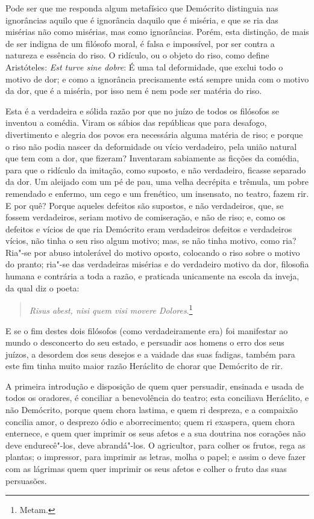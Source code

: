 Pode ser que me responda algum metafísico que Demócrito distinguia nas
ignorâncias aquilo que é ignorância daquilo que é miséria, e que se ria
das misérias não como misérias, mas como ignorâncias. Porém, esta
distinção, de mais de ser indigna de um filósofo moral, é falsa e
impossível, por ser contra a natureza e essência do riso. O ridículo, ou
o objeto do riso, como define Aristóteles: \emph{Est turve sine dobre}:
É uma tal deformidade, que exclui todo o motivo de dor; e como a
ignorância precisamente está sempre unida com o motivo da dor, que é a
miséria, por isso nem é nem pode ser matéria do riso.

Esta é a verdadeira e sólida razão por que no juízo de todos os
filósofos se inventou a comédia. Viram os sábios das repúblicas que para
desafogo, divertimento e alegria dos povos era necessária alguma matéria
de riso; e porque o riso não podia nascer da deformidade ou vício
verdadeiro, pela união natural que tem com a dor, que fizeram?
Inventaram sabiamente as ficções da comédia, para que o ridículo da
imitação, como suposto, e não verdadeiro, ficasse separado da dor. Um
aleijado com um pé de pau, uma velha decrépita e trêmula, um pobre
remendado e enfermo, um cego e um frenético, um insensato, no teatro,
fazem rir. E por quê? Porque aqueles defeitos são supostos, e não
verdadeiros, que, se fossem verdadeiros, seriam motivo de comiseração, e
não de riso; e, como os defeitos e vícios de que ria Demócrito eram
verdadeiros defeitos e verdadeiros vícios, não tinha o seu riso algum
motivo; mas, se não tinha motivo, como ria? Ria"-se por abuso intolerável
do motivo oposto, colocando o riso sobre o motivo do pranto; ria"-se das
verdadeiras misérias e do verdadeiro motivo da dor, filosofia humana e
contrária a toda a razão, e praticada unicamente na escola da inveja, da
qual diz o poeta:

\begin{verse}
\emph{Risus abest, nisi quem visi movere Dolores}.\footnote{Metam.}
\end{verse}

E se o fim destes dois filósofos (como verdadeiramente era) foi
manifestar ao mundo o desconcerto do seu estado, e persuadir aos homens
o erro dos seus juízos, a desordem dos seus desejos e a vaidade das suas
fadigas, também para este fim tinha muito maior razão Heráclito de
chorar que Demócrito de rir.

A primeira introdução e disposição de quem quer persuadir, ensinada e
usada de todos os oradores, é conciliar a benevolência do teatro; esta
conciliava Heráclito, e não Demócrito, porque quem chora lastima, e quem
ri despreza, e a compaixão concilia amor, o desprezo ódio e
aborrecimento; quem ri exaspera, quem chora enternece, e quem quer
imprimir os seus afetos e a sua doutrina nos corações não deve
endurecê"-los, deve abrandá"-los. O agricultor, para colher os frutos,
rega as plantas; o impressor, para imprimir as letras, molha o papel; e
assim o deve fazer com as lágrimas quem quer imprimir os seus afetos e
colher o fruto das suas persuasões.

